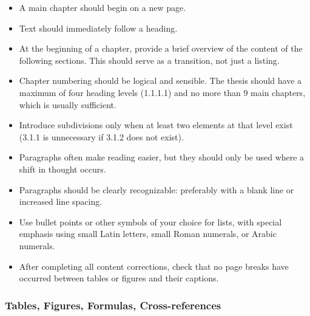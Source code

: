 \documentclass[a4paper, fleqn, headsepline, footsepline, 12pt, parskip=half]{scrartcl}
\begin{document}
\begin{itemize}
    \item A main chapter should begin on a new page.
    \item Text should immediately follow a heading.
    \item At the beginning of a chapter, provide a brief overview of the content of the following sections. This should serve as a transition, not just a listing.
    \item Chapter numbering should be logical and sensible. The thesis should have a maximum of four heading levels (1.1.1.1) and no more than 9 main chapters, which is usually sufficient.
    \item Introduce subdivisions only when at least two elements at that level exist (3.1.1 is unnecessary if 3.1.2 does not exist).
    \item Paragraphs often make reading easier, but they should only be used where a shift in thought occurs.
    \item Paragraphs should be clearly recognizable: preferably with a blank line or increased line spacing.
    \item Use bullet points or other symbols of your choice for lists, with special emphasis using small Latin letters, small Roman numerals, or Arabic numerals.
    \item After completing all content corrections, check that no page breaks have occurred between tables or figures and their captions.
\end{itemize}


\subsubsection{Tables, Figures, Formulas, Cross-references}
\label{sec:tables_figures_formulas_cross_references}
\end{document}
